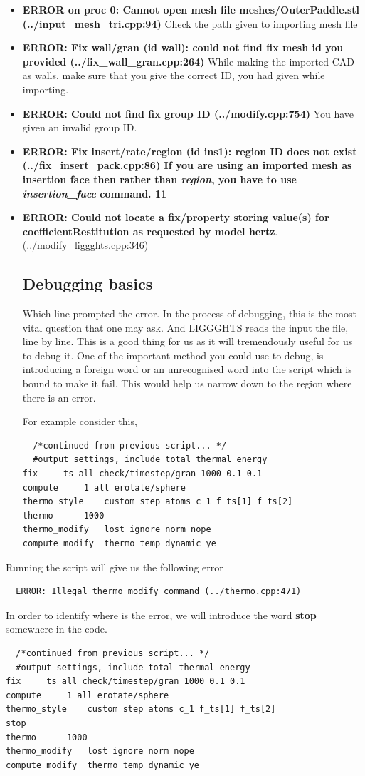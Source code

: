 \documentclass{tufte-book} %
\begin{document}
\begin{itemize}
\item \textbf{ERROR on proc 0: Cannot open mesh file meshes/OuterPaddle.stl (../input\_mesh\_tri.cpp:94)} Check the path given to importing mesh file
\item\textbf{ERROR: Fix wall/gran (id wall): could not find fix mesh id you provided (../fix\_wall\_gran.cpp:264)} While making the imported CAD as walls, make sure that you give the correct ID, you had given while importing.
\item \textbf{ERROR: Could not find fix group ID (../modify.cpp:754)} You have given an invalid group ID.
\item \textbf{ERROR: Fix insert/rate/region (id ins1): region ID does not exist (../fix\_insert\_pack.cpp:86) If you are using an imported mesh as insertion face then rather than \textit{region}, you have to use \textit{insertion\_face} command.
11
}
  \item \textbf{ERROR: Could not locate a fix/property storing value(s) for coefficientRestitution as requested by model hertz}. (../modify\_liggghts.cpp:346)
  
\subsection{Debugging basics}

Which line prompted the error. In the process of debugging, this is the most vital question that one may ask. And LIGGGHTS reads the input the file, line by line. This is a good thing for us as it will tremendously useful for us to debug it. One of the important method you could use to debug, is introducing a foreign word or an unrecognised word into the script which is bound to make it fail. This would help us narrow down to the region where there is an error.

For example consider this,

\begin{verbatim}
  /*continued from previous script... */
  #output settings, include total thermal energy
fix		ts all check/timestep/gran 1000 0.1 0.1
compute		1 all erotate/sphere
thermo_style	custom step atoms c_1 f_ts[1] f_ts[2]  
thermo		1000
thermo_modify	lost ignore norm nope
compute_modify	thermo_temp dynamic ye
  \end{verbatim}
\end{itemize}

Running the script will give us the following error
\begin{verbatim}
  ERROR: Illegal thermo_modify command (../thermo.cpp:471)
\end{verbatim}
In order to identify where is the error, we will introduce the word \textbf{stop} somewhere in the code.
\begin{verbatim}
  /*continued from previous script... */
  #output settings, include total thermal energy
fix		ts all check/timestep/gran 1000 0.1 0.1
compute		1 all erotate/sphere
thermo_style	custom step atoms c_1 f_ts[1] f_ts[2]  
stop
thermo		1000
thermo_modify	lost ignore norm nope
compute_modify	thermo_temp dynamic ye
  \end{verbatim}
\end{document}
